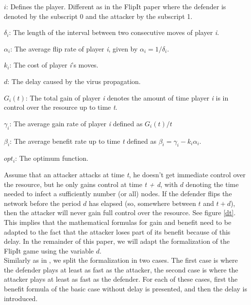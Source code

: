 \begin{description}
\item $i$: Defines the player. Different as in the FlipIt paper where the defender is denoted by the subscript 0 and the attacker by the subscript 1.
\item $\delta_{i}$: The length of the interval between two consecutive moves of player \textit{i}. 
\item $\alpha_{i}$: The average flip rate of player \textit{i}, given by $\alpha_{i}=1/\delta_{i}$.
\item $k_{i}$: The cost of player \textit{i}'s moves.
\item $d$: The delay caused by the virus propagation.
\item $G_{i}(t)$: The total gain of player \textit{i} denotes the amount of time player \textit{i} is in control over the resource up to time \textit{t}.
\item $\gamma_{i}$: The average gain rate of player \textit{i} defined as $G_{i}(t)/t$
\item $\beta_{i}$:  The average benefit rate up to time \textit{t} defined as  $\beta_{i} = \gamma_{i} -k_{i} \alpha_{i} $.
\item $opt_{i}$: The optimum function.
\end{description}

Assume that an attacker attacks at time \textit{t}, he doesn't get immediate control over the resource, but he only gains control at time \textit{t + d}, with $d$ denoting the time needed to infect a sufficiently number (or all) nodes. If the defender flips the network before the period $d$ has elapsed (so, somewhere between $t$ and $t + d$), then the attacker will never gain full control over the resource. See figure \ref{dt}. This implies that the mathematical formulas for gain and benefit need to be adapted to the fact that the attacker loses part of its benefit because of this delay. In the remainder of this paper, we will adapt the formalization of the FlipIt game using the variable $d$. \\ 


Similarly as in \cite{FlipIt}, we split the formalization in two cases. The first case is where the defender plays at least as fast as the attacker, the second case is where the attacker plays at least as fast as the defender. For each of these cases, first the benefit formula of the basic case without delay is presented, and then the delay is introduced.  \\

